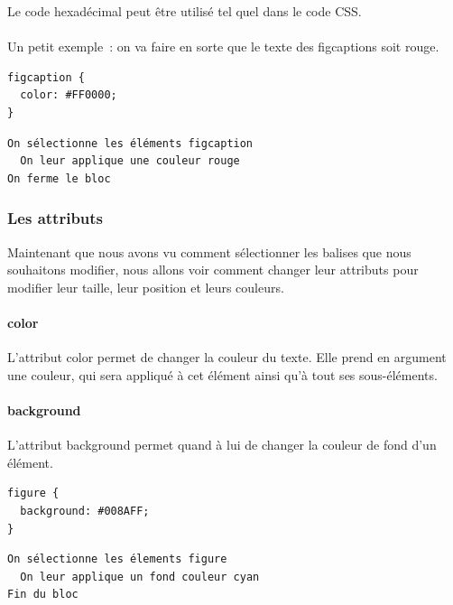 Le code hexadécimal peut être utilisé tel quel dans le code CSS.
\paragraph{}
Un petit exemple : on va faire en sorte que le texte des figcaptions soit rouge.

\begin{minipage}{0.40\textwidth}
\begin{verbatim}
figcaption {
  color: #FF0000;
}
\end{verbatim}
\end{minipage}
\begin{minipage}{0.60\textwidth}
\begin{verbatim}
On sélectionne les éléments figcaption
  On leur applique une couleur rouge
On ferme le bloc
\end{verbatim}
\end{minipage}

\subsubsection{Les attributs}
Maintenant que nous avons vu comment sélectionner les balises que nous
souhaitons modifier, nous allons voir comment changer leur attributs pour
modifier leur taille, leur position et leurs couleurs.

\paragraph{color}
L'attribut color permet de changer la couleur du texte. Elle prend en argument
une couleur, qui sera appliqué à cet élément ainsi qu'à tout ses sous-éléments.

\paragraph{background}
L'attribut background permet quand à lui de changer la couleur de fond d'un
élément.

\begin{minipage}{0.40\textwidth}
\begin{verbatim}
figure {
  background: #008AFF;
}
\end{verbatim}
\end{minipage}
\begin{minipage}{0.60\textwidth}
\begin{verbatim}
On sélectionne les élements figure
  On leur applique un fond couleur cyan
Fin du bloc
\end{verbatim}
\end{minipage}

